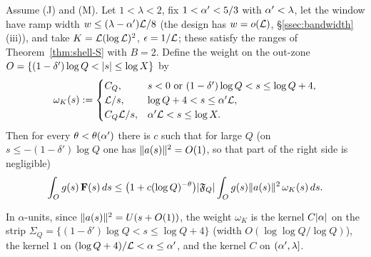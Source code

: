 \begin{theorem}\label{thm:shell-K}
Assume \textup{(J)} and \textup{(M)}. Let $1<\lambda<2$, fix $1<\alpha'<5/3$ with $\alpha'<\lambda$, let the window have ramp width $w\le(\lambda-\alpha')\mathcal L/8$ (the design has $w=o(\mathcal L)$,
\S\ref{ssec:bandwidth}(iii)), and take $K=\mathcal L(\log\mathcal L)^2$, $\epsilon=1/\mathcal L$; these satisfy the
ranges of Theorem~\ref{thm:shell-S} with $B=2$. Define the weight on the out-zone
$O=\{(1-\delta')\log Q<\lvert s\rvert\le\log X\}$ by
\[
\omega_K(s):=\begin{cases}C_Q,&s<0\ \text{or}\ (1-\delta')\log Q<s\le\log Q+4,\\ \Lc/s,&\log Q+4<s\le\alphap\Lc,\\ C_Q\Lc/s,&\alphap\Lc<s\le\log X.\end{cases}
\]
Then for every $\theta<\theta(\alpha')$ there is $c$ such that for large $Q$ (on $s\le-(1-\delta')\log Q$ one has $\lVert a(s)\rVert^2=O(1)$, so that part of the right side is negligible)
\[
\int_Og(s)\,\mathbf F(s)\,ds\le\bigl(1+c(\log Q)^{-\theta}\bigr)\lvert \mathfrak F_Q\rvert\int_Og(s)\lVert a(s)\rVert^2\,\omega_K(s)\,ds .
\]
\end{theorem}
In $\alpha$-units, since $\lVert a(s)\rVert^2=U(s+O(1))$, the weight $\omega_K$ is the kernel $C\lvert \alpha\rvert$ on the strip $\Sigma_Q=\{(1-\delta')\log Q<s\le\log Q+4\}$ (width
$O(\log\log Q/\log Q)$), the kernel $1$ on $(\log Q+4)/\mathcal L<\alpha\le\alpha'$, and the kernel $C$ on $(\alpha',\lambda]$.

